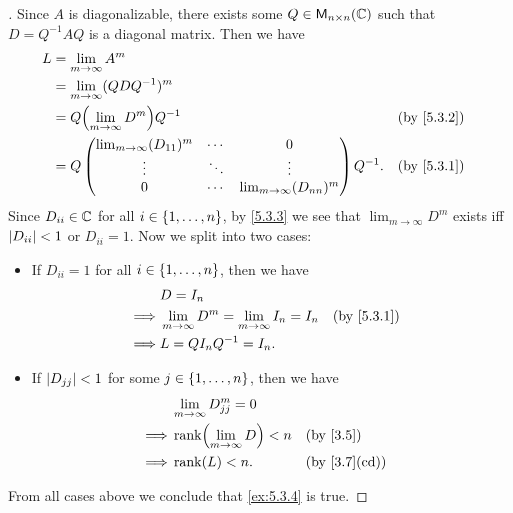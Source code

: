 \begin{proof}[]
	Since \(A\) is diagonalizable, there exists some \(Q \in \ms[n][n][\C]\) such that \(D = Q^{-1} A Q\) is a diagonal matrix.
	Then we have
	\begin{align*}
		L & = \lim_{m \to \infty} A^m                                                                     \\
		  & = \lim_{m \to \infty} (Q D Q^{-1})^m                                                          \\
		  & = Q \pa{\lim_{m \to \infty} D^m} Q^{-1}                                       &  & \by{5.3.2} \\
		  & = Q \begin{pmatrix}
			        \lim_{m \to \infty} (D_{1 1})^m & \cdots & 0                               \\
			        \vdots                          & \ddots & \vdots                          \\
			        0                               & \cdots & \lim_{m \to \infty} (D_{n n})^m
		        \end{pmatrix} Q^{-1}. &  & \by{5.3.1}                \\
	\end{align*}
	Since \(D_{i i} \in \mathbb{C}\) for all \(i \in \left\lbrace1, \dots, n\right\rbrace\), by \cref{5.3.3} we see that \(\lim_{m \to \infty} D^m\) exists iff \(\left\lvert D_{i i}\right\rvert < 1\) or \(D_{i i} = 1\).
	Now we split into two cases:
	\begin{itemize}
		\item If \(D_{i i} = 1\) for all \(i \in \left\lbrace1, \dots, n\right\rbrace\), then we have
		      \begin{align*}
			               & D = I_n                                                                 \\
			      \implies & \lim_{m \to \infty} D^m = \lim_{m \to \infty} I_n = I_n &  & \by{5.3.1} \\
			      \implies & L = Q I_n Q^{-1} = I_n.
		      \end{align*}
		\item If \(\left\lvert D_{j j}\right\rvert < 1\) for some \(j \in \left\lbrace1, \dots, n\right\rbrace\), then we have
		      \begin{align*}
			               & \lim_{m \to \infty} D_{j j}^m = 0                   \\
			      \implies & \rk{\lim_{m \to \infty} D} < n    &  & \by{3.5}     \\
			      \implies & \rk{L} < n.                       &  & \by{3.7}[cd]
		      \end{align*}
	\end{itemize}
	From all cases above we conclude that \cref{ex:5.3.4} is true.
\end{proof}

